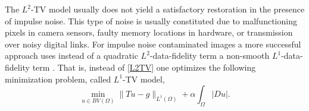 \documentclass[enabledeprecatedfontcommands,cleardoublepage=empty,headsepline,twoside,11pt,DIV=15,BCOR=12mm,final]{scrartcl}
\begin{document}
The $L^2$-TV model usually does not yield a satisfactory restoration in the presence of impulse noise. This type of noise is usually constituted due to malfunctioning pixels in camera sensors, faulty memory locations in hardware, or transmission over noisy digital links. 
For impulse noise contaminated images a more successful approach uses instead of a quadratic $L^2$-data-fidelity term a non-smooth $L^1$-data-fidelity term \cite{Alliney:97, Nikolova:02, Nikolova:04}. That is, instead of \eqref{L2TV} one optimizes the following minimization problem, called $L^1$-TV model,
\begin{equation}\label{L1TV}
\min_{u\in BV(\Omega)} \|Tu-g\|_{L^1(\Omega)} + \alpha \int_{\Omega}|Du|.
\end{equation}
\end{document}
